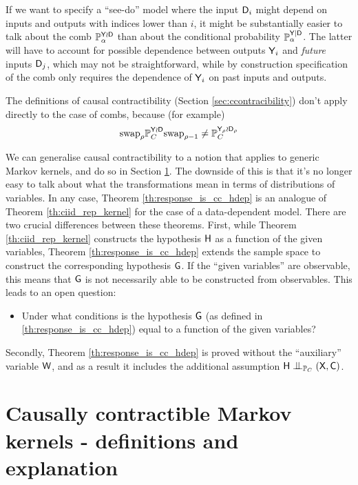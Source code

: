 If we want to specify a ``see-do'' model where the input $\mathsf{D}_i$ might depend on inputs and outputs with indices lower than $i$, it might be substantially easier to talk about the comb $\mathbb{P}_\alpha^{\mathsf{Y}\wr \mathsf{D}}$ than about the conditional probability $\mathbb{P}_\alpha^{\mathsf{Y}|\mathsf{D}}$. The latter will have to account for possible dependence between outputs $\mathsf{Y}_i$ and \emph{future} inputs $\mathsf{D}_j$, which may not be straightforward, while by construction specification of the comb only requires the dependence of $\mathsf{Y}_i$ on past inputs and outputs.

The definitions of causal contractibility (Section \ref{sec:ccontracibility}) don't apply directly to the case of combs, because (for example) 
\begin{align}
    \text{swap}_{\rho} \mathbb{P}_C^{\mathsf{Y}\wr \mathsf{D}} \text{swap}_{\rho-1} \neq \mathbb{P}_C^{\mathsf{Y}_{\rho}\wr \mathsf{D}_\rho}
\end{align}

We can generalise causal contractibility to a notion that applies to generic Markov kernels, and do so in Section \ref{sec:ccontracibile_kernel}. The downside of this is that it's no longer easy to talk about what the transformations mean in terms of distributions of variables. In any case, Theorem \ref{th:response_is_cc_hdep} is an analogue of Theorem \ref{th:ciid_rep_kernel} for the case of a data-dependent model. There are two crucial differences between these theorems. First, while Theorem \ref{th:ciid_rep_kernel} constructs the hypothesis $\mathsf{H}$ as a function of the given variables, Theorem \ref{th:response_is_cc_hdep} extends the sample space to construct the corresponding hypothesis $\mathsf{G}$. If the ``given variables'' are observable, this means that $\mathsf{G}$ is not necessarily able to be constructed from observables. This leads to an open question:
\begin{itemize}
    \item Under what conditions is the hypothesis $\mathsf{G}$ (as defined in \ref{th:response_is_cc_hdep}) equal to a function of the given variables?
\end{itemize}
Secondly, Theorem \ref{th:response_is_cc_hdep} is proved without the ``auxiliary'' variable $\mathsf{W}$, and as a result it includes the additional assumption $\RV{H}\CI_{\prob{P}_C} (\RV{X},\RV{C})$.

\section[Causally contractible Markov kernels]{Causally contractible Markov kernels - definitions and explanation}\label{sec:ccontracibile_kernel}

